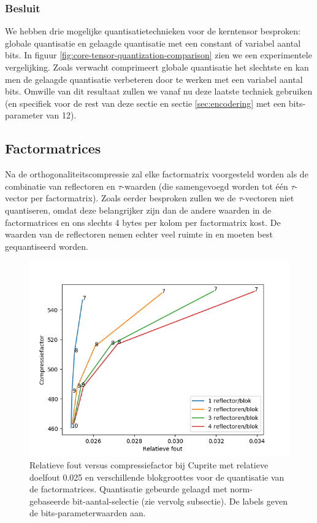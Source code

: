 \subsubsection{Besluit}

We hebben drie mogelijke quantisatietechnieken voor de kerntensor besproken: globale quantisatie en gelaagde quantisatie met een constant of variabel aantal bits. In figuur \ref{fig:core-tensor-quantization-comparison} zien we een experimentele vergelijking. Zoals verwacht comprimeert globale quantisatie het slechtste en kan men de gelaagde quantisatie verbeteren door te werken met een variabel aantal bits. Omwille van dit resultaat zullen we vanaf nu deze laatste techniek gebruiken (en specifiek voor de rest van deze sectie en sectie \ref{sec:encodering} met een bits-parameter van 12).

\subsection{Factormatrices}
\label{sec:quantisatie-factor-matrices}

Na de orthogonaliteitscompressie zal elke factormatrix voorgesteld worden als de combinatie van reflectoren en $\tau$-waarden (die samengevoegd worden tot \'e\'en $\tau$-vector per factormatrix). Zoals eerder besproken zullen we de $\tau$-vectoren niet quantiseren, omdat deze belangrijker zijn dan de andere waarden in de factormatrices en ons slechts 4 bytes per kolom per factormatrix kost. De waarden van de reflectoren nemen echter veel ruimte in en moeten best gequantiseerd worden.

\begin{figure}[H]
  \centering
  \includegraphics[scale=0.7]{images/factor_matrix_quantization_block_cols.png}
  \caption{Relatieve fout versus compressiefactor bij Cuprite met relatieve doelfout 0.025 en verschillende blokgroottes voor de quantisatie van de factormatrices. Quantisatie gebeurde gelaagd met norm-gebaseerde bit-aantal-selectie (zie vervolg subsectie). De labels geven de bits-parameterwaarden aan.}
\label{fig:factor-matrix-quantization-block-cols}
\end{figure}

